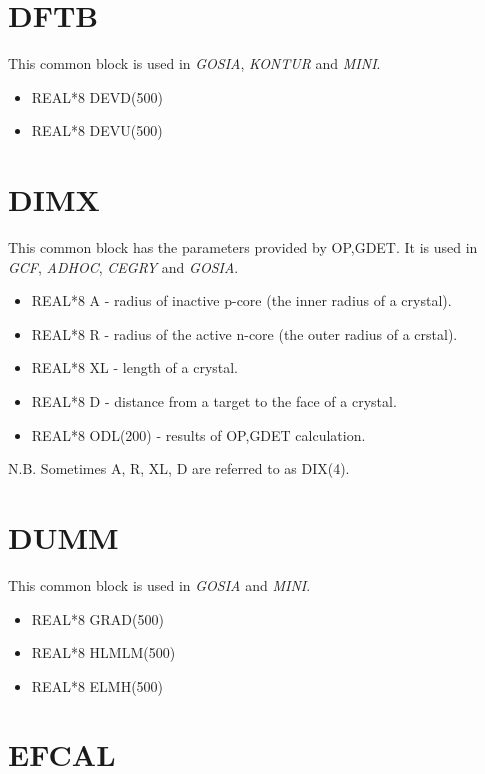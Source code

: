 \section{DFTB}

This common block is used in {\em GOSIA}, {\em KONTUR} and {\em MINI}.

\begin{itemize}
\item REAL*8 DEVD(500)
\item REAL*8 DEVU(500)
\end{itemize}

\section{DIMX}

This common block has the parameters provided by OP,GDET. It is used in {\em
GCF}, {\em ADHOC}, {\em CEGRY} and {\em GOSIA}.

\begin{itemize}
\item REAL*8 A - radius of inactive p-core (the inner radius of a crystal).
\item REAL*8 R - radius of the active n-core (the outer radius of a crstal).
\item REAL*8 XL - length of a crystal.
\item REAL*8 D - distance from a target to the face of a crystal.
\item REAL*8 ODL(200) - results of OP,GDET calculation.
\end{itemize}

N.B. Sometimes A, R, XL, D are referred to as DIX(4).

\section{DUMM}

This common block is used in {\em GOSIA} and {\em MINI}.

\begin{itemize}
\item REAL*8 GRAD(500)
\item REAL*8 HLMLM(500)
\item REAL*8 ELMH(500)
\end{itemize}

\section{EFCAL}

